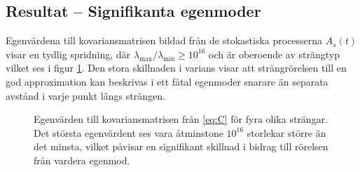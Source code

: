 \subsection{Resultat -- Signifikanta egenmoder}

Egenvärdena till kovariansmatrisen bildad från de stokastiska processerna $A_s(t)$ visar en tydlig spridning, där $\lambda_\text{max}/\lambda_\text{min}\geq 10^{16}$ och är oberoende av strängtyp vilket ses i figur \ref{fig:kovegenvarde}. Den stora skillnaden i varians visar att strängrörelsen till en god approximation kan beskrivas i ett fåtal egenmoder snarare än separata avstånd i varje punkt längs strängen. 



\begin{figure}
    \centering
    
    \caption{Egenvärden till kovariansmatrisen från \eqref{eq:C} för fyra olika strängar. Det största egenvärdent ses vara åtminstone $10^{16}$ storlekar större än det minsta, vilket påvisar en signifikant skillnad i bidrag till rörelsen från vardera egenmod.}
    \label{fig:kovegenvarde}
\end{figure}

\begin{figure}
    \centering
    
    \caption{}
    \label{fig:korrelation}
\end{figure}

\begin{figure}
    \centering
    
    \caption{}
    \label{fig:egenmoder}
\end{figure}

\begin{figure}
    \centering
    
    \caption{}
    \label{fig:modkorrektion}
\end{figure}


\begin{figure}\centerline{
\subfigure[][]{

}
\subfigure[][]{

}}
\caption{}
\label{fig:ktau}
\end{figure}





